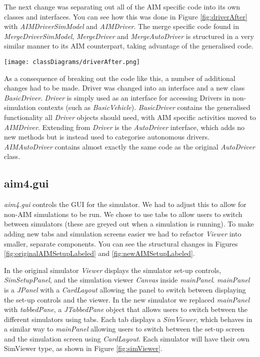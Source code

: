 \begin{appendices}
The next change was separating out all of the AIM specific code into its own classes and interfaces. You can see how this was done in Figure \ref{fig:driverAfter} with \emph{AIMDriverSimModel} and \emph{AIMDriver}. The merge specific code found in \emph{MergeDriverSimModel}, \emph{MergeDriver} and \emph{MergeAutoDriver} is structured in a very similar manner to its AIM counterpart, taking advantage of the generalised code.

\begin{sidewaysfigure}[p]
\texttt{[image: classDiagrams/driverAfter.png]}
\caption{The new class structure for \emph{Driver}.}
\label{fig:driverAfter}
\end{sidewaysfigure}

As a consequence of breaking out the code like this, a number of additional changes had to be made. Driver was changed into an interface and a new class \emph{BasicDriver}. \emph{Driver} is simply used as an interface for accessing Drivers in non-simulation contexts (such as \emph{BasicVehicle}). \emph{BasicDriver} contains the generalised functionality all \emph{Driver} objects should need, with AIM specific activities moved to \emph{AIMDriver}. Extending from \emph{Driver} is the \emph{AutoDriver} interface, which adds no new methods but is instead used to categorise autonomous drivers. \emph{AIMAutoDriver} contains almost exactly the same code as the original \emph{AutoDriver} class.

\FloatBarrier
\subsection{aim4.gui}
\label{subsec:aim4.gui}
\emph{aim4.gui} controls the GUI for the simulator. We had to adjust this to allow for non-AIM simulations to be run. We chose to use tabs to allow users to switch between simulators (these are greyed out when a simulation is running). To make adding new tabs and simulation screens easier we had to refactor \emph{Viewer} into smaller, separate components. You can see the structural changes in Figures \ref{fig:originalAIMSetupLabeled} and \ref{fig:newAIMSetupLabeled}.

In the original simulator \emph{Viewer} displays the simulator set-up controls, \emph{SimSetupPanel}, and the simulation viewer \emph{Canvas} inside \emph{mainPanel}. \emph{mainPanel} is a \emph{JPanel} with a \emph{CardLayout} allowing the panel to switch between displaying the set-up controls and the viewer. In the new simulator we replaced \emph{mainPanel} with \emph{tabbedPane}, a \emph{JTabbedPane} object that allows users to switch between the different simulators using tabs. Each tab displays a \emph{SimViewer}, which behaves in a similar way to \emph{mainPanel} allowing users to switch between the set-up screen and the simulation screen using \emph{CardLayout}. Each simulator will have their own SimViewer type, as shown in Figure \ref{fig:simViewer}.


\end{appendices}
